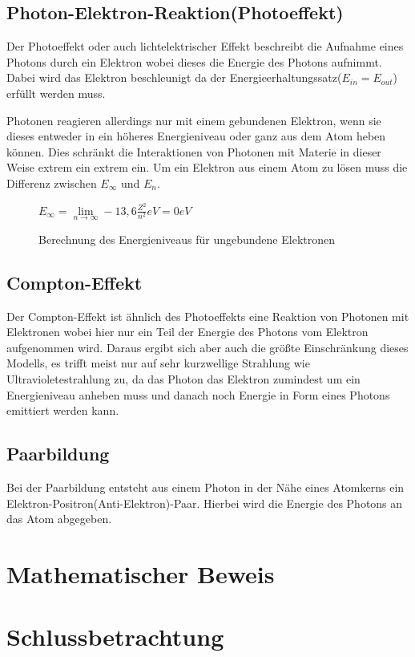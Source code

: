 \documentclass[11pt,a4paper,oneside]{report}
\begin{document}
\section{Photon-Elektron-Reaktion(Photoeffekt)}

Der Photoeffekt oder auch lichtelektrischer Effekt beschreibt die Aufnahme eines Photons durch ein Elektron wobei dieses die Energie des Photons aufnimmt.\cite{stroppe08} Dabei wird das Elektron beschleunigt da der Energieerhaltungssatz($E_{in}=E_{out}$) erfüllt werden muss. 

Photonen reagieren allerdings nur mit einem gebundenen Elektron, wenn sie dieses entweder in ein höheres Energieniveau oder ganz aus dem Atom heben können. Dies schränkt die Interaktionen von Photonen mit Materie in dieser Weise extrem ein extrem ein. Um ein Elektron aus einem Atom zu lösen muss die Differenz zwischen $E_\infty$ und $E_n$.
\begin{figure}[h]
\centering
$E_{\infty} = \lim\limits_{n \to \infty} -13,6\frac{Z^2}{n^2} eV= 0eV$
 \caption{Berechnung des Energieniveaus für ungebundene Elektronen\cite[S. 439]{stroppe08}}
\end{figure}

\section{Compton-Effekt}
Der Compton-Effekt ist ähnlich des Photoeffekts eine Reaktion von Photonen mit Elektronen wobei hier nur ein Teil der Energie des Photons vom Elektron aufgenommen wird. Daraus ergibt sich aber auch die größte Einschränkung dieses Modells, es trifft meist nur auf sehr kurzwellige Strahlung wie Ultravioletestrahlung zu\cite{stroppe08}, da das Photon das Elektron zumindest um ein Energieniveau anheben muss und danach noch Energie in Form eines Photons emittiert werden kann.

\section{Paarbildung}
Bei der Paarbildung entsteht aus einem Photon in der Nähe eines Atomkerns ein Elektron-Positron(Anti-Elektron)-Paar. Hierbei wird die Energie des Photons an das Atom abgegeben.

\chapter{Mathematischer Beweis}

\chapter{Schlussbetrachtung}

\clearpage

\pagestyle{empty}


\listoftables

\listoffigures


\end{document}
